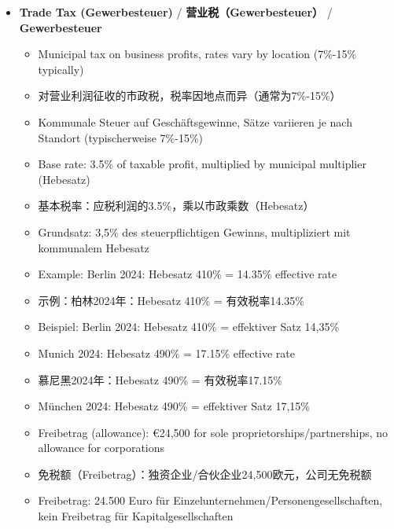 \begin{itemize}
    \item \textbf{Trade Tax (Gewerbesteuer)} / \textbf{营业税（Gewerbesteuer）} / \textbf{Gewerbesteuer}
    \begin{itemize}
        \item Municipal tax on business profits, rates vary by location (7\%-15\% typically)
        \item 对营业利润征收的市政税，税率因地点而异（通常为7\%-15\%）
        \item Kommunale Steuer auf Geschäftsgewinne, Sätze variieren je nach Standort (typischerweise 7\%-15\%)
        \item Base rate: 3.5\% of taxable profit, multiplied by municipal multiplier (Hebesatz)
        \item 基本税率：应税利润的3.5\%，乘以市政乘数（Hebesatz）
        \item Grundsatz: 3,5\% des steuerpflichtigen Gewinns, multipliziert mit kommunalem Hebesatz
        \item Example: Berlin 2024: Hebesatz 410\% = 14.35\% effective rate
        \item 示例：柏林2024年：Hebesatz 410\% = 有效税率14.35\%
        \item Beispiel: Berlin 2024: Hebesatz 410\% = effektiver Satz 14,35\%
        \item Munich 2024: Hebesatz 490\% = 17.15\% effective rate
        \item 慕尼黑2024年：Hebesatz 490\% = 有效税率17.15\%
        \item München 2024: Hebesatz 490\% = effektiver Satz 17,15\%
        \item Freibetrag (allowance): €24,500 for sole proprietorships/partnerships, no allowance for corporations
        \item 免税额（Freibetrag）：独资企业/合伙企业24,500欧元，公司无免税额
        \item Freibetrag: 24.500 Euro für Einzelunternehmen/Personengesellschaften, kein Freibetrag für Kapitalgesellschaften
    \end{itemize}
    

\end{itemize}
